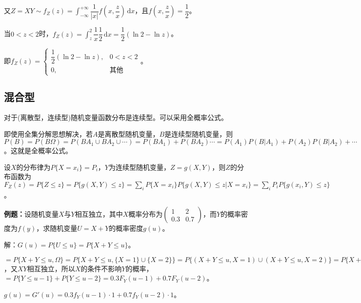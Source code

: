 又$Z=XY\sim f_Z(z)=\displaystyle{\int_{-\infty}^{+\infty}\dfrac{1}{\vert x\vert}f\left(x,\dfrac{z}{x}\right)\,\textrm{d}x}$，且$f\left(x,\dfrac{z}{x}\right)=\dfrac{1}{2}$。

当$0<z<2$时，$f_Z(z)=\displaystyle{\int_z^2}\dfrac{1}{x}\dfrac{1}{2}\,\textrm{d}x=\dfrac{1}{2}(\ln2-\ln z)$。

即$f_Z(z)=\left\{\begin{array}{ll}
    \dfrac{1}{2}(\ln2-\ln z), & 0<z<2 \\
    0, & \text{其他}
\end{array}\right.$。

\subsection{混合型}
 
对于(离散型，连续型)随机变量函数分布是连续型。可以采用全概率公式。

即使用全集分解思想解决，若$A$是离散型随机变量，$B$是连续型随机变量，则$P(B)=P(B\Omega)=P(BA_1\cup BA_2\cup\cdots)=P(BA_1)+P(BA_2)\cdots=P(A_1)P(B|A_1)+P(A_2)P(B|A_2)+\cdots$。这就是全概率公式。

设$X$的分布律为$P\{X=x_i\}=P_i$，$Y$为连续型随机变量，$Z=g(X,Y)$，则$Z$的分布函数为$F_Z(z)=P\{Z\leqslant z\}=P\{g(X,Y)\leqslant z\}=\sum\limits_iP\{X=x_i\}P\{g(X,Y)\leqslant z|X=x_i\}=\sum\limits_iP_iP\{g(x_i,Y)\leqslant z\}$。

\textbf{例题：}设随机变量$X$与$Y$相互独立，其中$X$概率分布为$\left(\begin{array}{cc}
    1 & 2 \\
    0.3 & 0.7
\end{array}\right)$，而$Y$的概率密度为$f(y)$，求随机变量$U=X+Y$的概率密度$g(u)$。

解：$G(u)=P\{U\leqslant u\}=P\{X+Y\leqslant u\}$。

$=P\{X+Y\leqslant u,\Omega\}=P\{X+Y\leqslant u,\{X=1\}\cup\{X=2\}\}=P\{(X+Y\leqslant u,X=1)\cup(X+Y\leqslant u,X=2)\}=P\{X+Y\leqslant u,X=1\}+P\{X+Y\leqslant u,X=2\}=P(X=1)P\{X+Y\leqslant u|X=1\}+P(X=2)P\{X+Y\leqslant u|X=2\}=0.3P\{Y\leqslant u-1|X=1\}+0.7P\{Y\leqslant u-2|X=2\}$，又$XY$相互独立，所以$X$的条件不影响$Y$的概率，$=P\{Y\leqslant u-1\}+P\{Y\leqslant u-2\}=0.3F_Y(u-1)+0.7F_Y(u-2)$。

$g(u)=G'(u)=0.3f_Y(u-1)\cdot1+0.7f_Y(u-2)\cdot1$。

%
